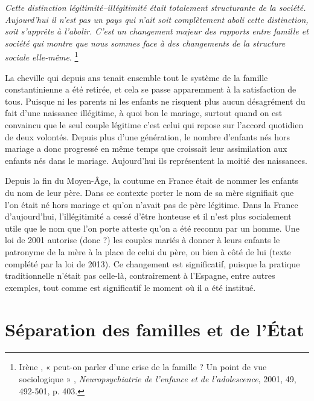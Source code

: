  {\emph{Cette distinction légitimité--illégitimité était totalement structurante de la société. Aujourd'hui il n'est pas un pays qui n'ait soit complètement aboli cette distinction, soit s'apprête à l'abolir. C'est un changement majeur des rapports entre famille et société qui montre que nous sommes face à des changements de la structure sociale elle-même}.%
\footnote{Irène , « peut-on parler d'une crise de la famille ? Un point de vue sociologique » , \emph{Neuropsychiatrie de l'enfance et de l'adolescence}, 2001, 49, 492-501, p. 403.}%
}

 La cheville qui depuis  ans tenait ensemble tout le système de la famille constantinienne a été retirée, et cela se passe apparemment à la satisfaction de tous. Puisque ni les parents ni les enfants ne risquent plus aucun désagrément du fait d'une naissance illégitime, à quoi bon le mariage, surtout quand on est convaincu que le seul couple légitime c'est celui qui repose sur l'accord quotidien de deux volontés. Depuis plus d'une génération, le nombre d'enfants nés hors mariage a donc progressé en même temps que croissait leur assimilation aux enfants nés dans le mariage. Aujourd'hui ils représentent la moitié des naissances. 

 Depuis la fin du Moyen-Âge, la coutume en France était de nommer les enfants du nom de leur père. Dans ce contexte porter le nom de sa mère signifiait que l'on était né hors mariage et qu'on n'avait pas de père légitime. Dans la France d'aujourd'hui, l'illégitimité a cessé d'être honteuse et il n'est plus socialement utile que le nom que l'on porte atteste qu'on a été reconnu par un homme. Une loi de 2001 autorise (donc ?) les couples mariés à donner à leurs enfants le patronyme de la mère à la place de celui du père, ou bien à côté de lui (texte complété par la loi  de 2013). Ce changement est significatif, puisque la pratique traditionnelle n'était pas celle-là, contrairement à l'Espagne, entre autres exemples, tout comme est significatif le moment où il a été institué. 


\section{Séparation des familles et de l'État}

